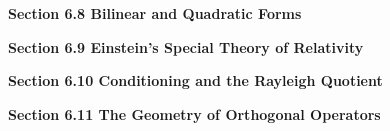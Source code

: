 \documentclass[11pt,largemargins]{homework}
\begin{document}
\question

\question

\question

\question

\textbf{\large{Section 6.8} Bilinear and Quadratic Forms}
\setcounter{questionCounter}{0}
\question

\question

\question

\question

\question

\question

\question

\question

\question

\question

\textbf{\large{Section 6.9} Einstein's Special Theory of Relativity}
\setcounter{questionCounter}{0}
\question

\question

\question

\question

\question

\question

\question

\question

\question

\question

\textbf{\large{Section 6.10} Conditioning and the Rayleigh Quotient}
\setcounter{questionCounter}{0}
\question

\question

\question

\question

\question

\question

\question

\question

\question

\question

\textbf{\large{Section 6.11} The Geometry of Orthogonal Operators}
\setcounter{questionCounter}{0}
\question

\question

\question

\question

\question

\question

\question

\question

\question

\question
\end{document}
